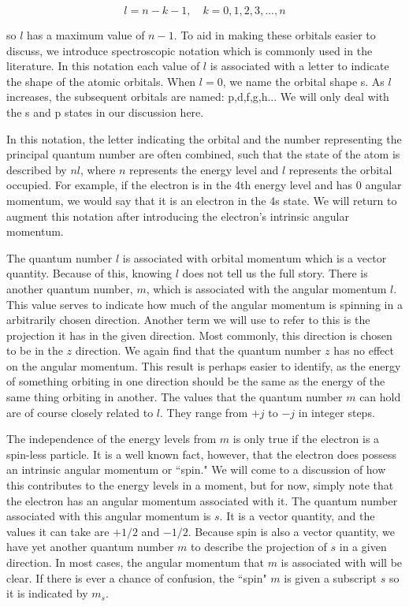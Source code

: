 \documentclass[12pt]{article}
\begin{document}
		\begin{equation}
			l=n-k-1,\quad k=0,1,2,3,...,n
		\end{equation}

		so $l$ has a maximum value of $n-1$. To aid in making
		these orbitals easier to discuss, we introduce 
		spectroscopic notation which is commonly used in the 
		literature. In this notation
		each value of $l$ is associated with a letter to indicate
		the shape of the atomic orbitals. When $l=0$, we name the 
		orbital shape s. As $l$ increases, the subsequent orbitals
		are named: p,d,f,g,h... We will only deal with the s and p 
		states in our discussion here. 

		In this notation, the letter indicating the orbital 
		and the number representing the principal quantum number 
		are often combined, such that the state of the atom 
		is described by $nl$, where $n$
		represents the energy level and $l$ represents the orbital
		occupied. For example, if the electron is in the 4th energy
		level and has 0 angular momentum, we would say that it is
		an electron in the 4s state. We will return to augment this 
		notation after introducing the electron's intrinsic angular
		momentum.

		The quantum number $l$ is associated with orbital momentum 
		which is a vector quantity. Because of this, knowing $l$
		does not tell us the full story. 
		There is another quantum number, $m$, which is associated 
		with the angular momentum $l$. This value serves to indicate
		how much of the angular momentum is spinning in a arbitrarily
		chosen direction. Another term we will use to refer to this
		is the projection it has in the given direction.
		Most commonly, this direction is chosen
		to be in the $z$ direction. We again find that the quantum
        number $z$ has no effect on the angular momentum. This result
        is perhaps easier to identify, as the energy of something 
        orbiting in one direction should be the same as the energy 
        of the same thing orbiting in another. The values that the 
		quantum number $m$ can hold are of course
		closely related to $l$. They range from $+j$ to $-j$ in
		integer steps. 

        The independence of the energy levels from $m$ is only true
        if the electron is a spin-less particle. It is a well known
        fact, however, that the electron does possess an intrinsic 
        angular momentum or ``spin." We will come to a discussion of 
        how this contributes to the energy levels in a moment, but 
        for now, simply note that the electron has an angular 
        momentum associated with it. The quantum number associated
        with this angular momentum is $s$. It is a vector 
		quantity, and the values it can take are $+1/2$ and $-1/2$.
		Because spin is also a vector quantity, we have 
		yet another quantum number $m$ to describe the projection 
		of $s$ in a given direction. In most cases, the angular
		momentum that $m$ is associated with will be clear. If
		there is ever a chance of confusion, the ``spin" $m$ is
		given a subscript $s$ so it is indicated by $m_s$.
\end{document}

